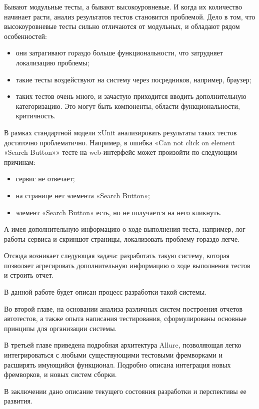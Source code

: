 \startprefacepage

Бывают модульные тесты, а бывают высокоуровневые. И когда их количество начинает расти, анализ результатов тестов становится проблемой. Дело в том, что высокоуровневые тесты сильно отличаются от модульных, и обладают рядом особенностей:

\begin{itemize}
\item они затрагивают гораздо больше функциональности, что затрудняет локализацию проблемы; 
\item такие тесты воздействуют на систему через посредников, например, браузер;
\item таких тестов очень много, и зачастую приходится вводить дополнительную категоризацию. Это могут быть компоненты, области функциональности, критичность.
\end{itemize}

В рамках стандартной модели xUnit анализировать результаты таких тестов достаточно проблематично. Например, в ошибка «Can not click on element «Search Button»» тесте на web-интерфейс может произойти по следующим причинам:

\begin{itemize}
\item сервис не отвечает;
\item на странице нет элемента «Search Button»;
\item элемент «Search Button» есть, но не получается на него кликнуть.
\end{itemize}

А имея дополнительную информацию о ходе выполнения теста, например, лог работы сервиса и скриншот страницы, локализовать проблему гораздо легче. 

Отсюда возникает следующая задача: разработать такую систему, которая позволяет агрегировать дополнительную информацию о ходе выполнения тестов и строить отчет. 

В данной работе будет описан процесс разработки такой системы.

Во второй главе, на основании анализа различных систем построения отчетов автотестов, а также опыта написания тестирования, сформулированы основные принципы для организации системы.

В третьей главе приведена подробная архитектура Allure, позволяющая легко интегрироваться с любыми существующими тестовыми фремворками и расширять имующийся функционал. Подробно описана интеграция новых фремворков, и новых систем сборки.

В заключении дано описание текущего состояния разработки и перспективы ее развития.